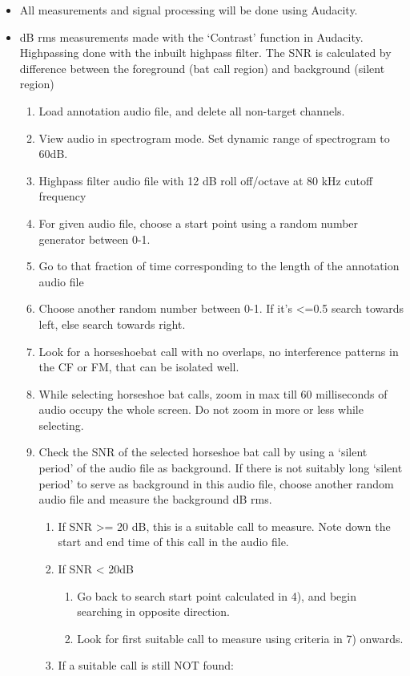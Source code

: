 \documentclass[
]{book}
\providecommand{\tightlist}{%
  \setlength{\itemsep}{0pt}\setlength{\parskip}{0pt}}
\begin{document}
\begin{itemize}
\item
  All measurements and signal processing will be done using Audacity.
\item
  dB rms measurements made with the `Contrast' function in Audacity. Highpassing done with the inbuilt highpass filter. The SNR is calculated by difference between the foreground (bat call region) and background (silent region)

  \begin{enumerate}
  \def\labelenumi{\arabic{enumi}.}
  \tightlist
  \item
    Load annotation audio file, and delete all non-target channels.
  \item
    View audio in spectrogram mode. Set dynamic range of spectrogram to 60dB.
  \item
    Highpass filter audio file with 12 dB roll off/octave at 80 kHz cutoff frequency
  \item
    For given audio file, choose a start point using a random number generator between 0-1.
  \item
    Go to that fraction of time corresponding to the length of the annotation audio file
  \item
    Choose another random number between 0-1. If it's \textless=0.5 search towards left, else search towards right.
  \item
    Look for a horseshoebat call with no overlaps, no interference patterns in the CF or FM, that can be isolated well.
  \item
    While selecting horseshoe bat calls, zoom in max till 60 milliseconds of audio occupy the whole screen. Do not zoom in more or less while selecting.
  \item
    Check the SNR of the selected horseshoe bat call by using a `silent period' of the audio file as background. If there is not suitably long `silent period' to serve as background in this audio file, choose another random audio file and measure the background dB rms.

    \begin{enumerate}
    \def\labelenumii{\alph{enumii}.}
    \tightlist
    \item
      If SNR \textgreater= 20 dB, this is a suitable call to measure. Note down the start and end time of this call in the audio file.
    \item
      If SNR \textless{} 20dB

      \begin{enumerate}
      \def\labelenumiii{\roman{enumiii}.}
      \tightlist
      \item
        Go back to search start point calculated in 4), and begin searching in opposite direction.
      \item
        Look for first suitable call to measure using criteria in 7) onwards.
      \end{enumerate}
    \item
      If a suitable call is still NOT found:


\end{enumerate}
\end{enumerate}
\end{itemize}
\end{document}
